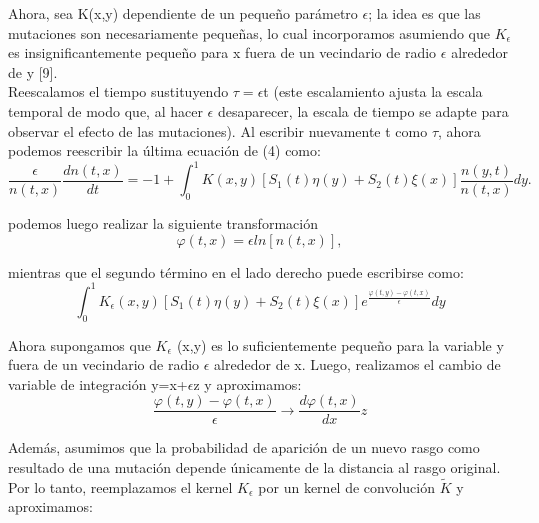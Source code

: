 \documentclass[letterpaper]{article}
\begin{document}
{        \normalsize{Ahora, sea K(x,y) dependiente de un pequeño parámetro $\epsilon$; la idea es que las mutaciones son necesariamente pequeñas, lo cual incorporamos asumiendo que $K_\epsilon$ es insignificantemente pequeño para x fuera de un vecindario de radio $\epsilon$ alrededor de y [9].}\\

        \normalsize{Reescalamos el tiempo sustituyendo $\tau=\epsilon$t (este escalamiento ajusta la escala temporal de modo que, al hacer $\epsilon$ desaparecer, la escala de tiempo se adapte para observar el efecto de las mutaciones). Al escribir nuevamente t como $\tau$, ahora podemos reescribir la última ecuación de (4) como:}\\

        \begin{equation}
            \frac{\epsilon}{n(t,x)}\frac{d n(t,x)}{dt}=-1+\int_{0}^{1}K(x,y)[S_1(t)\eta(y)+S_2(t)\xi(x)]\frac{n(y,t)}{n(t,x)}dy.
        \end{equation}

        \normalsize{podemos luego realizar la siguiente transformación}\\

        \begin{equation}
            \varphi(t,x)=\epsilon ln[n(t,x)],
        \end{equation}

        \normalsize{mientras que el segundo término en el lado derecho puede escribirse como:}\\

        \begin{equation}
            \int_{0}^{1}K_{\epsilon}(x,y)[S_1(t)\eta(y)+S_2(t)\xi(x)]e^{\frac{\varphi(t,y)-\varphi(t,x)}{\epsilon}}dy
        \end{equation}

        \normalsize{Ahora supongamos que $K_{\epsilon}$ (x,y) es lo suficientemente pequeño para la variable y fuera de un vecindario de radio $\epsilon$ alrededor de x. Luego, realizamos el cambio de variable de integración y=x+$\epsilon$z y aproximamos:}\\

        \begin{equation}
            \frac{\varphi(t,y)-\varphi(t,x)}{\epsilon} \to \frac{d\varphi(t,x) }{dx}z
        \end{equation}

        \normalsize{Además, asumimos que la probabilidad de aparición de un nuevo rasgo como resultado de una mutación depende únicamente de la distancia al rasgo original. Por lo tanto, reemplazamos el kernel $K_{\epsilon}$ por un kernel de convolución $\widetilde{K}$ y aproximamos:}\\

}
\end{document}
